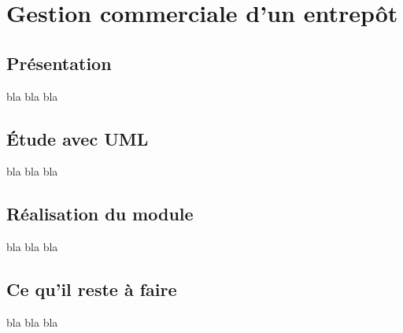 \chapter{Gestion commerciale d'un entrepôt}
\section{Présentation}
bla bla bla

\section{Étude avec UML}
bla bla bla

\section{Réalisation du module}
bla bla bla

\section{Ce qu'il reste à faire}
bla bla bla
